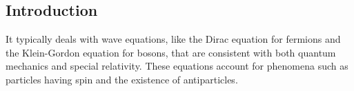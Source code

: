 
\subsection{Introduction}

It typically deals with wave equations, like the Dirac equation for fermions and the Klein-Gordon equation for bosons, that are consistent with both quantum mechanics and special relativity. These equations account for phenomena such as particles having spin and the existence of antiparticles.

